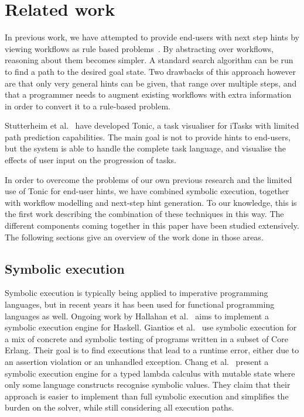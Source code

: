 
\section{Related work}
\label{sec:relatedwork}

In previous work, we have attempted to provide end-users with next step hints by viewing workflows as rule based problems~\cite{DBLP:conf/sfp/NausJ16}.
By abstracting over workflows, reasoning about them becomes simpler.
A standard search algorithm can be run to find a path to the desired goal state.
Two drawbacks of this approach however are that only very general hints can be given, that range over multiple steps, and that a programmer needs to augment existing workflows with extra information in order to convert it to a rule-based problem.

Stutterheim et al.~\cite{DBLP:conf/sfp/StutterheimPA14} have developed Tonic, a task visualiser for iTasks with limited path prediction capabilities.
The main goal is not to provide hints to end-users, but the system is able to handle the complete task language, and visualise the effects of user input on the progression of tasks.

In order to overcome the problems of our own previous research and the limited use of Tonic for end-user hints, we have combined symbolic execution, together with workflow modelling and next-step hint generation.
To our knowledge, this is the first work describing the combination of these techniques in this way.
The different components coming together in this paper have been studied extensively.
The following sections give an overview of the work done in those areas.

\subsection{Symbolic execution}


Symbolic execution \cite{King1975,Boyer1975} is typically being applied to imperative programming languages,
but in recent years it has been used for functional programming languages as well.
Ongoing work by Hallahan et al.~\cite{HallahanXP2017,DBLP:conf/pldi/HallahanXBJP19} aims to implement a symbolic execution engine for Haskell.
Giantios et al.~\cite{GiantsiosPS2017} use symbolic execution for a mix of concrete and symbolic testing of programs written in a subset of Core Erlang.
Their goal is to find executions that lead to a runtime error, either due to an assertion violation or an unhandled exception.
Chang et al.~\cite{ChangKT2018} present a symbolic execution engine for a typed lambda calculus with mutable state where only some language constructs recognise symbolic values.
They claim that their approach is easier to implement than full symbolic execution and simplifies the burden on the solver, while still considering all execution paths.

